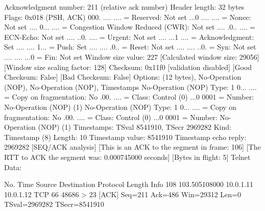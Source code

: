     Acknowledgment number: 211    (relative ack number)
    Header length: 32 bytes
    Flags: 0x018 (PSH, ACK)
        000. .... .... = Reserved: Not set
        ...0 .... .... = Nonce: Not set
        .... 0... .... = Congestion Window Reduced (CWR): Not set
        .... .0.. .... = ECN-Echo: Not set
        .... ..0. .... = Urgent: Not set
        .... ...1 .... = Acknowledgment: Set
        .... .... 1... = Push: Set
        .... .... .0.. = Reset: Not set
        .... .... ..0. = Syn: Not set
        .... .... ...0 = Fin: Not set
    Window size value: 227
    [Calculated window size: 29056]
    [Window size scaling factor: 128]
    Checksum: 0x11f0 [validation disabled]
        [Good Checksum: False]
        [Bad Checksum: False]
    Options: (12 bytes), No-Operation (NOP), No-Operation (NOP), Timestamps
        No-Operation (NOP)
            Type: 1
                0... .... = Copy on fragmentation: No
                .00. .... = Class: Control (0)
                ...0 0001 = Number: No-Operation (NOP) (1)
        No-Operation (NOP)
            Type: 1
                0... .... = Copy on fragmentation: No
                .00. .... = Class: Control (0)
                ...0 0001 = Number: No-Operation (NOP) (1)
        Timestamps: TSval 8541910, TSecr 2969282
            Kind: Timestamp (8)
            Length: 10
            Timestamp value: 8541910
            Timestamp echo reply: 2969282
    [SEQ/ACK analysis]
        [This is an ACK to the segment in frame: 106]
        [The RTT to ACK the segment was: 0.000745000 seconds]
        [Bytes in flight: 5]
Telnet
    Data: 

No.     Time           Source                Destination           Protocol Length Info
    108 103.505108000  10.0.1.11             10.0.1.12             TCP      66     48686 > 23 [ACK] Seq=211 Ack=486 Win=29312 Len=0 TSval=2969282 TSecr=8541910

